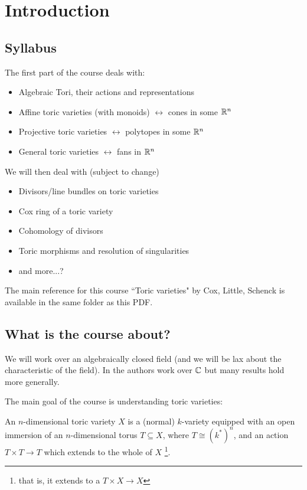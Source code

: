 \chapter*{Introduction}
\section*{Syllabus}
The first part of the course deals with:
\begin{itemize}
    \item Algebraic Tori, their actions and representations
    \item Affine toric varieties (with monoids) $\leftrightarrow$ cones in some $\mathbb{R}^n$
    \item Projective toric varieties $\leftrightarrow$ polytopes in some $\mathbb{R}^n$
    \item General toric varieties $\leftrightarrow$ fans in $\mathbb{R}^n$
\end{itemize}
We will then deal with (subject to change)
\begin{itemize}
    \item Divisors/line bundles on toric varieties
    \item Cox ring of a toric variety
    \item Cohomology of divisors
    \item Toric morphisms and resolution of singularities
    \item and more...?
\end{itemize}
The main reference for this course \textemdash ``Toric varieties" by Cox, Little, Schenck \cite{cox2011toric} \textemdash is available in the same folder as this PDF.

\section*{What is the course about?}
We will work over an algebraically closed field (and we will be lax about the characteristic of the field). In \cite{cox2011toric} the authors work over $\mathbb{C}$ but many results hold more generally.
\medskip

The main goal of the course is understanding toric varieties:
\begin{definition}
An $n$-dimensional toric variety $X$ is a (normal) $k$-variety equipped with an open immersion of an $n$-dimensional torus $T\subseteq X$, where $T\cong (k^\ast)^n$, and an action $T\times T\to T$ which extends to the whole of $X$ \footnote{that is, it extends to a $T\times X\to X$}.
\end{definition}

